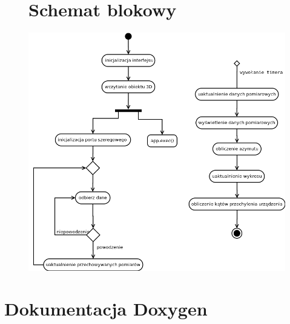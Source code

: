 \documentclass{article}
\begin{document}
\begin{figure}[H]
\section{Schemat blokowy}
  \centering
  \includegraphics[width=0.75\linewidth]{Diagram2.png}
\end{figure}

\vfill
\section{Dokumentacja Doxygen}

    
\end{document}
